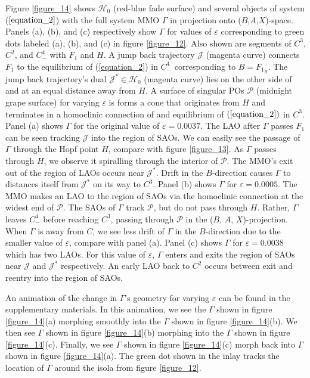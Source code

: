 \documentclass{ws-ijbc}
\begin{document}
Figure \ref{figure_14} shows $\mathscr{H}_0$ (red-blue fade surface) and several objects of system ($\ref{equation_2}$) with the full system MMO $\Gamma$ in projection onto ($B$,$A$,$X$)-space.  Panels (a), (b), and (c) respectively show $\Gamma$ for values of $\varepsilon$ corresponding to green dots labeled (a), (b), and (c) in figure \ref{figure_12}.  Also shown are segments of $C^3$, $C^2$, and $C^4_-$ with $F_1$ and $H$.  A jump back trajectory $\mathscr{J}$ (magenta curve) connects $F_1$ to the equilibrium of (\ref{equation_2}) in $C^4_-$ corresponding to $B=F_{1_B}$.  The jump back trajectory's dual $\mathscr{J}^* \in \mathscr{H}_0$ (magenta curve) lies on the other side of and at an equal distance away from $H$.  A surface of singular POs $\mathscr{P}$ (midnight grape surface) for varying $\varepsilon$ is forms a cone that originates from $H$ and terminates in a homoclinic connection of and equilibrium of $(\ref{equation_2})$ in $C^3$.  Panel (a) shows $\Gamma$ for the original value of $\varepsilon=0.0037$.  The LAO after $\Gamma$ passes $F_1$ can be seen tracking $\mathscr{J}$ into the region of SAOs.  We can easily see the passage of $\Gamma$ through the Hopf point $H$, compare with figure \ref{figure_13}.  As $\Gamma$ passes through $H$, we observe it spiralling through the interior of $\mathscr{P}$.  The MMO's exit out of the region of LAOs occurs near $\mathscr{J}^*$. Drift in the $B$-direction causes $\Gamma$ to distances itself from $\mathscr{J}^*$ on its way to $C^3$.  Panel (b) shows $\Gamma$ for $\varepsilon=0.0005$.  The MMO makes an LAO to the region of SAOs via the homoclinic connection at the widest end of $\mathscr{P}$.  The SAOs of $\Gamma$ track $\mathscr{P}$, but do not pass through $H$.  Rather, $\Gamma$ leaves $C^4_-$ before reaching $C^3$, passing through $\mathscr{P}$ in the ($B$, $A$, $X$)-projection.  When $\Gamma$ is away from $C$, we see less drift of $\Gamma$ in the $B$-direction due to the smaller value of $\varepsilon$, compare with panel (a).  Panel (c) shows $\Gamma$ for $\varepsilon=0.0038$ which has two LAOs.  For this value of $\varepsilon$, $\Gamma$ enters and exits the region of SAOs near $\mathscr{J}$ and $\mathscr{J}^*$ respectively.  An early LAO back to $C^2$ occurs between exit and reentry into the region of SAOs.

An animation of the change in $\Gamma$'s geometry for varying $\varepsilon$ can be found in the supplementary materials.  In this animation, we see the $\Gamma$ shown in figure \ref{figure_14}(a) morphing smoothly into the $\Gamma$ shown in figure \ref{figure_14}(b).  We then see $\Gamma$ shown in figure \ref{figure_14}(b) morphing into the $\Gamma$ shown in figure \ref{figure_14}(c).  Finally, we see $\Gamma$ shown in figure \ref{figure_14}(c) morph back into $\Gamma$ shown in figure \ref{figure_14}(a).  The green dot shown in the inlay tracks the location of $\Gamma$ around the isola from figure \ref{figure_12}.
\end{document}
